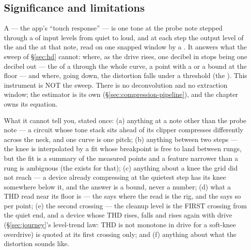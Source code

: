 \documentclass[11pt,a4paper]{article}
\begin{document}
\subsection{Significance and limitations}
A  --- the app's ``touch response'' --- is one
tone at the probe note stepped through a  of input levels
from quiet to loud, and at each step the output level of the
 and the  at that note, read on one snapped
window by a . It answers what the sweep of
\S\ref{sec:hd} cannot: where, as the drive rises, one decibel in stops
being one decibel out --- the  of a  through
the whole curve, a point with a  or a bound at the
floor --- and where, going down, the distortion falls under a threshold
(the ). This instrument is NOT the sweep. There is no
deconvolution and no extraction window; the estimator is its own
(\S\ref{sec:compression-pipeline}), and the chapter owns its equation.

What it cannot tell you, stated once: (a) anything at a note other than
the probe note --- a circuit whose tone stack sits ahead of its clipper
compresses differently across the neck, and one curve is one pitch;
(b) anything between two steps --- the knee is interpolated by a fit
whose breakpoint is free to land between rungs, but the fit is a summary
of the measured points and a feature narrower than a rung is ambiguous
(the  exists for that); (c) anything about a knee the
grid did not reach --- a device already compressing at the quietest step
has its knee somewhere below it, and the answer is a bound, never a
number; (d) what a THD read near its floor is --- the 
says where the read is the rig, and the  says so per
point; (e) the second crossing --- the cleanup level is the FIRST
crossing from the quiet end, and a device whose THD rises, falls and
rises again with drive (\S\ref{sec:journey}'s level-trend law: THD is not
monotone in drive for a soft-knee overdrive) is quoted at its first
crossing only; and (f) anything about what the distortion sounds like.
\end{document}
